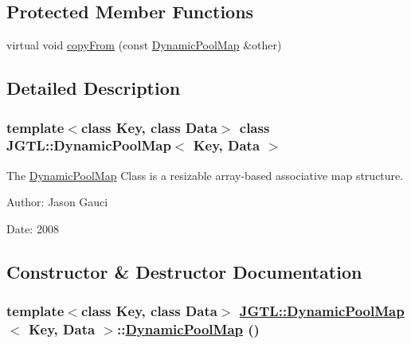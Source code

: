 \subsection*{Protected Member Functions}
\begin{CompactItemize}
\item 
virtual void \hyperlink{class_j_g_t_l_1_1_dynamic_pool_map_bce0771b0a4cc6238e7e3e24f5ec3bf0}{copy\-From} (const \hyperlink{class_j_g_t_l_1_1_dynamic_pool_map}{Dynamic\-Pool\-Map} \&other)
\end{CompactItemize}


\subsection{Detailed Description}
\subsubsection*{template$<$class Key, class Data$>$ class JGTL::Dynamic\-Pool\-Map$<$ Key, Data $>$}

The \hyperlink{class_j_g_t_l_1_1_dynamic_pool_map}{Dynamic\-Pool\-Map} Class is a resizable array-based associative map structure. 

\begin{Desc}
\item[Author:]Jason Gauci \end{Desc}
\begin{Desc}
\item[Date:]2008 \end{Desc}




\subsection{Constructor \& Destructor Documentation}
\hypertarget{class_j_g_t_l_1_1_dynamic_pool_map_07c6425b3ff8be9bb668c187f6431b76}{
\subsubsection[DynamicPoolMap]{\setlength{\rightskip}{0pt plus 5cm}template$<$class Key, class Data$>$ \hyperlink{class_j_g_t_l_1_1_dynamic_pool_map}{JGTL::Dynamic\-Pool\-Map}$<$ Key, Data $>$::\hyperlink{class_j_g_t_l_1_1_dynamic_pool_map}{Dynamic\-Pool\-Map} ()}}
\label{class_j_g_t_l_1_1_dynamic_pool_map_07c6425b3ff8be9bb668c187f6431b76}


